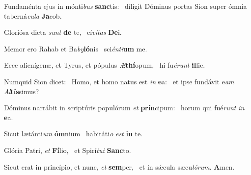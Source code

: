 \item Fundaménta ejus in mónti\textit{bus} \textbf{sanc}tis:~\psstar{} díligit Dóminus portas Sion super ómnia taberná\textit{cula} \textbf{Ja}cob.
\item Gloriósa dicta \textit{sunt} \textbf{de} te,~\psstar{} cí\textit{vitas} \textbf{De}i.
\item Memor ero Rahab et Ba\textit{by}\textbf{ló}nis~\psstar{} sci\textit{énti}\textbf{um} me.
\item Ecce alienígenæ, et Tyrus, et pópulus \textit{Æ}\textbf{thí}opum,~\psstar{} hi fu\textit{érunt} \textbf{il}lic.
\item Numquid Sion dicet:~\pscross{} Homo, et homo natus est \textit{in} \textbf{e}a:~\psstar{} et ipse fundávit e\textit{am} \textit{Al}\textbf{tís}simus?
\item Dóminus narrábit in scriptúris populórum \textit{et} \textbf{prín}cipum:~\psstar{} horum qui fué\textit{runt} \textit{in} \textbf{e}a.
\item Sicut lætánti\textit{um} \textbf{óm}nium~\psstar{} habitáti\textit{o} \textit{est} \textbf{in} te.
\item Glória Patri, \textit{et} \textbf{Fí}lio,~\psstar{} et Spirí\textit{tui} \textbf{Sanc}to.
\item Sicut erat in princípio, et nunc, \textit{et} \textbf{sem}per,~\psstar{} et in sǽcula sæcu\textit{lórum}. \textbf{A}men.